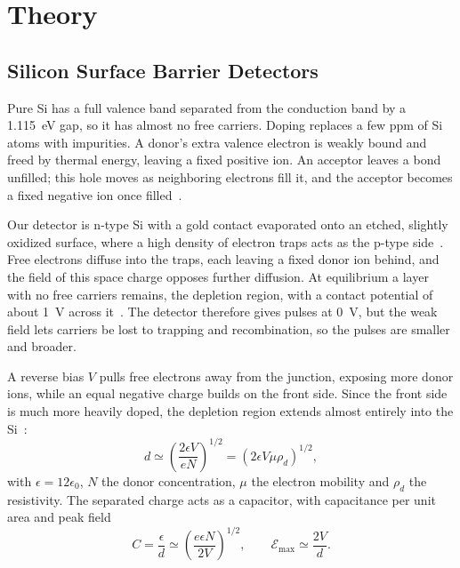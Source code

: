 \section{Theory}
\label{sec:theory}

\subsection{Silicon Surface Barrier Detectors}
\label{subsec:si}

Pure Si has a full valence band separated from the conduction band by a 1.115~eV gap, so it has almost no free carriers. Doping replaces a few ppm of Si atoms with impurities. A donor's extra valence electron is weakly bound and freed by thermal energy, leaving a fixed positive ion. An acceptor leaves a bond unfilled; this hole moves as neighboring electrons fill it, and the acceptor becomes a fixed negative ion once filled~\cite{knoll}.

Our detector is n-type Si with a gold contact evaporated onto an etched, slightly oxidized surface, where a high density of electron traps acts as the p-type side~\cite{knoll}. Free electrons diffuse into the traps, each leaving a fixed donor ion behind, and the field of this space charge opposes further diffusion. At equilibrium a layer with no free carriers remains, the depletion region, with a contact potential of about 1~V across it~\cite{knoll}. The detector therefore gives pulses at 0~V, but the weak field lets carriers be lost to trapping and recombination, so the pulses are smaller and broader.

A reverse bias $V$ pulls free electrons away from the junction, exposing more donor ions, while an equal negative charge builds on the front side. Since the front side is much more heavily doped, the depletion region extends almost entirely into the Si~\cite{knoll}:
\begin{equation}
    d \simeq \left(\frac{2\epsilon V}{eN}\right)^{1/2} = \left(2\epsilon V \mu \rho_d\right)^{1/2},
    \label{eq:depletion}
\end{equation}
with $\epsilon = 12\epsilon_0$, $N$ the donor concentration, $\mu$ the electron mobility and $\rho_d$ the resistivity. The separated charge acts as a capacitor, with capacitance per unit area and peak field~\cite{knoll}
\begin{equation}
    C = \frac{\epsilon}{d} \simeq \left(\frac{e\epsilon N}{2V}\right)^{1/2}, \qquad \mathcal{E}_{\max} \simeq \frac{2V}{d}.
    \label{eq:capfield}
\end{equation}

